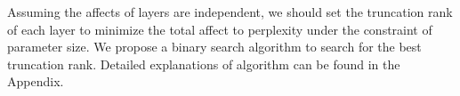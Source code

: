 Assuming the affects of layers are independent, we should set the truncation rank of each layer to minimize the total affect to perplexity under the constraint of parameter size.
We propose a binary search algorithm to search for the best truncation rank.
Detailed explanations of algorithm can be found in the Appendix. 



